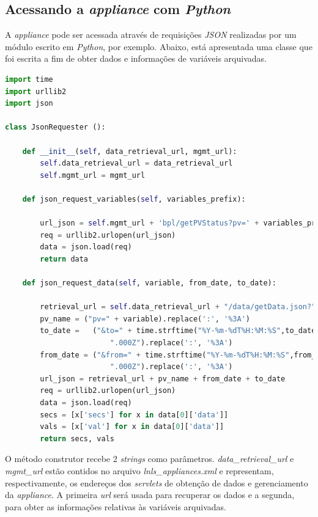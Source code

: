 \subsection{Acessando a \textit{appliance} com \textit{Python}}

A \textit{appliance} pode ser acessada através de requisições \textit{JSON}
realizadas por um módulo escrito em \textit{Python}, por exemplo. Abaixo, está
apresentada uma classe que foi escrita a fim de obter dados e informações de
variáveis arquivadas.

\vspace{12pt}

\begin{lstlisting}[language=Python]
import time
import urllib2
import json

class JsonRequester ():
    
    def __init__(self, data_retrieval_url, mgmt_url):
        self.data_retrieval_url = data_retrieval_url
        self.mgmt_url = mgmt_url
    
    def json_request_variables(self, variables_prefix):
        
        url_json = self.mgmt_url + 'bpl/getPVStatus?pv=' + variables_prefix
        req = urllib2.urlopen(url_json)
        data = json.load(req)
        return data
    
    def json_request_data(self, variable, from_date, to_date):    
        
        retrieval_url = self.data_retrieval_url + "/data/getData.json?"
        pv_name = ("pv=" + variable).replace(':', '%3A')
        to_date =   ("&to=" + time.strftime("%Y-%m-%dT%H:%M:%S",to_date) + 
        				".000Z").replace(':', '%3A')
        from_date = ("&from=" + time.strftime("%Y-%m-%dT%H:%M:%S",from_date) + 
        				".000Z").replace(':', '%3A')    
        url_json = retrieval_url + pv_name + from_date + to_date
        req = urllib2.urlopen(url_json)
        data = json.load(req)
        secs = [x['secs'] for x in data[0]['data']]
        vals = [x['val'] for x in data[0]['data']]
        return secs, vals
\end{lstlisting}

O método construtor recebe 2 \textit{strings} como parâmetros.
\textit{data\_retrieval\_url} e \textit{mgmt\_url} estão contidos no arquivo
\textit{lnls\_appliances.xml} e representam, respectivamente, os endereços dos
\textit{servlets} de obtenção de dados e gerenciamento da \textit{appliance}. A
primeira \textit{url} será usada para recuperar os dados e a segunda, para obter
as informações relativas às variáveis arquivadas.

